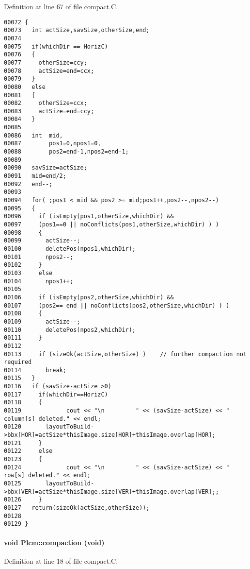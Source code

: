 Definition at line 67 of file compact.C.\small\begin{verbatim}00072 {
00073   int actSize,savSize,otherSize,end;
00074 
00075   if(whichDir == HorizC)
00076   {
00077     otherSize=ccy;
00078     actSize=end=ccx;
00079   }
00080   else
00081   {
00082     otherSize=ccx;
00083     actSize=end=ccy;
00084   }
00085 
00086   int  mid,
00087        pos1=0,npos1=0,
00088        pos2=end-1,npos2=end-1;
00089 
00090   savSize=actSize;
00091   mid=end/2;
00092   end--;
00093 
00094   for( ;pos1 < mid && pos2 >= mid;pos1++,pos2--,npos2--) 
00095   {
00096     if (isEmpty(pos1,otherSize,whichDir) && 
00097     (pos1==0 || noConflicts(pos1,otherSize,whichDir) ) )
00098     {
00099       actSize--;
00100       deletePos(npos1,whichDir);
00101       npos2--;
00102     }
00103     else
00104       npos1++;
00105 
00106     if (isEmpty(pos2,otherSize,whichDir) &&
00107     (pos2== end || noConflicts(pos2,otherSize,whichDir) ) )
00108     {
00109       actSize--;
00110       deletePos(npos2,whichDir); 
00111     }
00112     
00113     if (sizeOk(actSize,otherSize) )    // further compaction not required
00114       break;
00115   }
00116   if (savSize-actSize >0)
00117     if(whichDir==HorizC)
00118     {
00119             cout << "\n         " << (savSize-actSize) << "  column[s] deleted." << endl;
00120       layoutToBuild->bbx[HOR]=actSize*thisImage.size[HOR]+thisImage.overlap[HOR];
00121     }
00122     else
00123     {
00124             cout << "\n         " << (savSize-actSize) << "  row[s] deleted." << endl;
00125       layoutToBuild->bbx[VER]=actSize*thisImage.size[VER]+thisImage.overlap[VER];;
00126     }
00127   return(sizeOk(actSize,otherSize));
00128 
00129 }
\end{verbatim}\normalsize 
\label{Plcm_a8}
\paragraph{\setlength{\rightskip}{0pt plus 5cm}void Plcm::compaction (void)}\hfill



Definition at line 18 of file compact.C.

